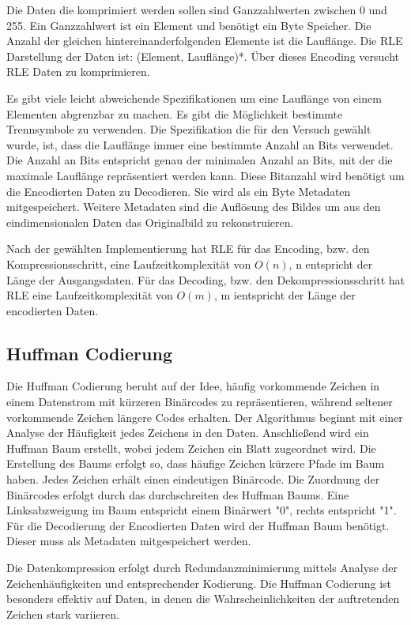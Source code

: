 \documentclass[conference]{IEEEtran}
\begin{document}
Die Daten die komprimiert werden sollen sind Ganzzahlwerten zwischen 0 und 255.
Ein Ganzzahlwert ist ein Element und benötigt ein Byte Speicher.
Die Anzahl der gleichen hintereinanderfolgenden Elemente ist die Lauflänge. 
Die RLE Darstellung der Daten ist: (Element, Lauflänge)*.
Über dieses Encoding versucht RLE Daten zu komprimieren.

Es gibt viele leicht abweichende Spezifikationen um eine Lauflänge 
von einem Elementen abgrenzbar zu machen.
Es gibt die Möglichkeit bestimmte Trennsymbole zu verwenden.
Die Spezifikation die für den Versuch gewählt wurde, ist, 
dass die Lauflänge immer eine bestimmte Anzahl an Bits verwendet.
Die Anzahl an Bits entspricht genau der minimalen Anzahl an Bits,
mit der die maximale Lauflänge repräsentiert werden kann.
Diese Bitanzahl wird benötigt um die Encodierten Daten zu Decodieren.
Sie wird als ein Byte Metadaten mitgespeichert.
Weitere Metadaten sind die 
Auflösung des Bildes um aus den eindimensionalen Daten das Originalbild 
zu rekonstruieren.

Nach der gewählten Implementierung hat
RLE für das Encoding, bzw. den Kompressionsschritt, eine 
Laufzeitkomplexität von $O(n)$, n entspricht der Länge der Ausgangsdaten. 
Für das Decoding, bzw. den Dekompressionsschritt hat RLE eine 
Laufzeitkomplexität von $O(m)$, m ientspricht der Länge der encodierten Daten. \cite{nick} 

\subsection{Huffman Codierung}

Die Huffman Codierung beruht auf der Idee, häufig vorkommende Zeichen in einem Datenstrom 
mit kürzeren Binärcodes zu repräsentieren, während seltener vorkommende Zeichen längere Codes 
erhalten. 
Der Algorithmus beginnt mit einer Analyse der Häufigkeit jedes Zeichens in den Daten.
Anschließend wird ein Huffman Baum erstellt, wobei jedem Zeichen ein Blatt zugeordnet wird.
Die Erstellung des Baums erfolgt so, dass häufige Zeichen kürzere Pfade im Baum haben.
Jedes Zeichen erhält einen eindeutigen Binärcode.
Die Zuordnung der Binärcodes erfolgt durch das durchschreiten des Huffman Baums. 
Eine Linksabzweigung im Baum entspricht einem Binärwert "0", rechts entspricht "1". 
Für die Decodierung der Encodierten Daten wird der Huffman Baum benötigt. 
Dieser muss als Metadaten mitgespeichert werden. 

Die Datenkompression erfolgt durch Redundanzminimierung mittels Analyse 
der Zeichenhäufigkeiten und entsprechender Kodierung.
Die Huffman Codierung ist besonders effektiv auf Daten, in denen die 
Wahrscheinlichkeiten der auftretenden Zeichen stark variieren.
\cite{moffat}
\end{document}
